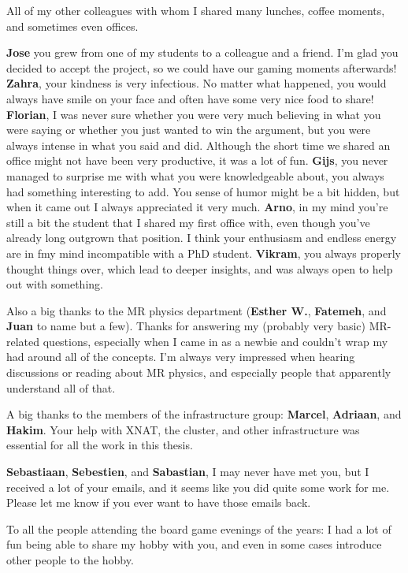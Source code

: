All of my other colleagues with whom I shared many lunches, coffee moments, and sometimes even offices.

\textbf{Jose} you grew from one of my students to a colleague and a friend.
I'm glad you decided to accept the project, so we could have our gaming moments afterwards!
\textbf{Zahra}, your kindness is very infectious.
No matter what happened, you would always have smile on your face and often have some very nice food to share!
\textbf{Florian}, I was never sure whether you were very much believing in what you were saying or whether you just wanted to win the argument, but you were always intense in what you said and did.
Although the short time we shared an office might not have been very productive, it was a lot of fun.
\textbf{Gijs}, you never managed to surprise me with what you were knowledgeable about, you always had something interesting to add.
You sense of humor might be a bit hidden, but when it came out I always appreciated it very much.
\textbf{Arno}, in my mind you're still a bit the student that I shared my first office with, even though you've already long outgrown that position.
I think your enthusiasm and endless energy are in fmy mind incompatible with a PhD student.
\textbf{Vikram}, you always properly thought things over, which lead to deeper insights, and was always open to help out with something.

Also a big thanks to the MR physics department (\textbf{Esther W.}, \textbf{Fatemeh}, and \textbf{Juan} to name but a few).
Thanks for answering my (probably very basic) MR-related questions, especially when I came in as a newbie and couldn't wrap my had around all of the concepts.
I'm always very impressed when hearing discussions or reading about MR physics, and especially people that apparently understand all of that.

A big thanks to the members of the infrastructure group: \textbf{Marcel}, \textbf{Adriaan}, and \textbf{Hakim}.
Your help with XNAT, the cluster, and other infrastructure was essential for all the work in this thesis.

\textbf{Sebastiaan}, \textbf{Sebestien}, and \textbf{Sabastian}, I may never have met you, but I received a lot of your emails, and it seems like you did quite some work for me.
Please let me know if you ever want to have those emails back.

To all the people attending the board game evenings of the years: I had a lot of fun being able to share my hobby with you, and even in some cases introduce other people to the hobby.

